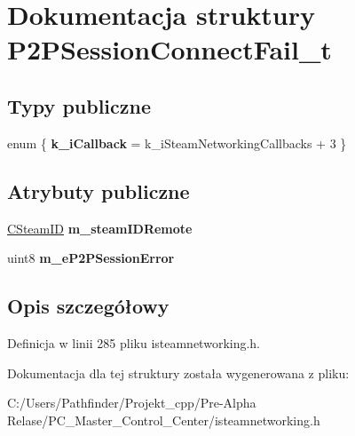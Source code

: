 \hypertarget{struct_p2_p_session_connect_fail__t}{}\section{Dokumentacja struktury P2\+P\+Session\+Connect\+Fail\+\_\+t}
\label{struct_p2_p_session_connect_fail__t}
\subsection*{Typy publiczne}
\begin{DoxyCompactItemize}
\item 
\mbox{\label{struct_p2_p_session_connect_fail__t_a1389994ccb41f270b7d80d6d6b31aef8}} 
enum \{ {\bfseries k\+\_\+i\+Callback} = k\+\_\+i\+Steam\+Networking\+Callbacks + 3
 \}
\end{DoxyCompactItemize}
\subsection*{Atrybuty publiczne}
\begin{DoxyCompactItemize}
\item 
\mbox{\label{struct_p2_p_session_connect_fail__t_ade3d751a2f4a4c553aa2121d8468a279}} 
\hyperlink{class_c_steam_i_d}{C\+Steam\+ID} {\bfseries m\+\_\+steam\+I\+D\+Remote}
\item 
\mbox{\label{struct_p2_p_session_connect_fail__t_aa40014390a39c69faf190805ef4ffa2a}} 
uint8 {\bfseries m\+\_\+e\+P2\+P\+Session\+Error}
\end{DoxyCompactItemize}


\subsection{Opis szczegółowy}


Definicja w linii 285 pliku isteamnetworking.\+h.



Dokumentacja dla tej struktury została wygenerowana z pliku\+:\begin{DoxyCompactItemize}
\item 
C\+:/\+Users/\+Pathfinder/\+Projekt\+\_\+cpp/\+Pre-\/\+Alpha Relase/\+P\+C\+\_\+\+Master\+\_\+\+Control\+\_\+\+Center/isteamnetworking.\+h\end{DoxyCompactItemize}
